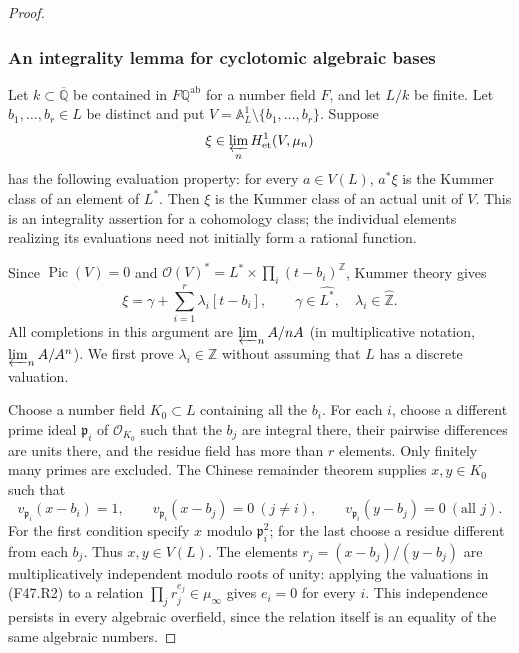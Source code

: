 \begin{proof}
\subsubsection*{An integrality lemma for cyclotomic algebraic bases}

Let $k\subset\overline{\mathbb Q}$ be contained in
$F\mathbb Q^{\mathrm{ab}}$ for a number field $F$, and let $L/k$ be
finite. Let $b_1,\ldots,b_r\in L$ be distinct and put
$V=\mathbb A^1_L\setminus\{b_1,\ldots,b_r\}$.
Suppose
\[
 \xi\in\varprojlim_n H^1_{\mathrm{et}}(V,\mu_n)
\]
has the following evaluation property: for every $a\in V(L)$,
$a^*\xi$ is the Kummer class of an element of $L^*$.
Then $\xi$ is the Kummer class of an actual unit of $V$.
This is an integrality assertion for a cohomology class; the individual
elements realizing its evaluations need not initially form a rational
function.


Since $\operatorname{Pic}(V)=0$ and
$\mathcal O(V)^*=L^*\times\prod_i(t-b_i)^{\mathbb Z}$, Kummer theory gives
\[
 \xi=\gamma+\sum_{i=1}^r\lambda_i[t-b_i],\qquad
 \gamma\in\widehat{L^*},\quad \lambda_i\in\widehat{\mathbb Z}.
                                                        \tag{F47.R1}
\]
All completions in this argument are $\varprojlim_n A/nA$ (in
multiplicative notation, $\varprojlim_n A/A^n$). We first prove
$\lambda_i\in\mathbb Z$ without assuming that $L$ has a discrete
valuation.

Choose a number field $K_0\subset L$ containing all the $b_i$.
For each $i$, choose a different prime ideal $\mathfrak p_i$ of
$\mathcal O_{K_0}$ such that the $b_j$ are integral there, their pairwise
differences are units there, and the residue field has more than $r$
elements. Only finitely many primes are excluded. The Chinese remainder
theorem supplies $x,y\in K_0$ such that
\[
 v_{\mathfrak p_i}(x-b_i)=1,\qquad
 v_{\mathfrak p_i}(x-b_j)=0\ (j\ne i),\qquad
 v_{\mathfrak p_i}(y-b_j)=0\ (\text{all }j).
                                                        \tag{F47.R2}
\]
For the first condition specify $x$ modulo $\mathfrak p_i^2$; for the
last choose a residue different from each $b_j$. Thus $x,y\in V(L)$.
The elements $r_j=(x-b_j)/(y-b_j)$ are multiplicatively independent
modulo roots of unity: applying the valuations in (F47.R2) to a relation
$\prod_j r_j^{e_j}\in\mu_\infty$ gives $e_i=0$ for every $i$.
This independence persists in every algebraic overfield, since the
relation itself is an equality of the same algebraic numbers.


\end{proof}
